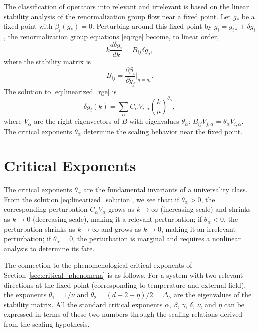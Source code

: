 \documentclass[11pt, twoside, openright]{book}
\theoremstyle{dotted}
\theoremstyle{definition}
\begin{document}
The classification of operators into relevant and irrelevant is based on the
linear stability analysis of the renormalization group flow near a fixed point.
Let $g_*$ be a fixed point with $\beta_i(g_*) = 0$. Perturbing around this fixed
point by $g_i = g_{i*} + \delta g_i$, the renormalization group equations
\eqref{eq:rge} become, to linear order,
\begin{equation}
  k\frac{d\delta g_i}{dk} = B_{ij}\delta g_j,
  \label{eq:linearized_rge}
\end{equation}
where the stability matrix is
\begin{equation}
  B_{ij} = \frac{\partial \beta_i}{\partial g_j}\bigg|_{g=g_*}.
  \label{eq:stability_matrix}
\end{equation}
The solution to \eqref{eq:linearized_rge} is
\begin{equation}
  \delta g_i(k) = \sum_\alpha C_\alpha V_{i,\alpha} \left(\frac{k}{\mu}\right)^{\theta_\alpha},
  \label{eq:linearized_solution}
\end{equation}
where $V_\alpha$ are the right eigenvectors of $B$ with eigenvalues $\theta_\alpha$:
$B_{ij}V_{j,\alpha} = \theta_\alpha V_{i,\alpha}$. The critical exponents $\theta_\alpha$
determine the scaling behavior near the fixed point.

\section{Critical Exponents}

The critical exponents $\theta_\alpha$ are the fundamental invariants of a
universality class. From the solution \eqref{eq:linearized_solution}, we see that:
if $\theta_\alpha > 0$, the corresponding perturbation $C_\alpha V_\alpha$ grows
as $k \to \infty$ (increasing scale) and shrinks as $k \to 0$ (decreasing scale),
making it a relevant perturbation; if $\theta_\alpha < 0$, the perturbation shrinks
as $k \to \infty$ and grows as $k \to 0$, making it an irrelevant perturbation;
if $\theta_\alpha = 0$, the perturbation is marginal and requires a nonlinear
analysis to determine its fate.

The connection to the phenomenological critical exponents of Section~\ref{sec:critical_phenomena} is as follows. For a system with two relevant directions
at the fixed point (corresponding to temperature and external field), the exponents
$\theta_1 = 1/\nu$ and $\theta_2 = (d + 2 - \eta)/2 = \Delta_h$ are the
eigenvalues of the stability matrix. All the standard critical exponents $\alpha$,
$\beta$, $\gamma$, $\delta$, $\nu$, and $\eta$ can be expressed in terms of these
two numbers through the scaling relations derived from the scaling hypothesis.
\end{document}
